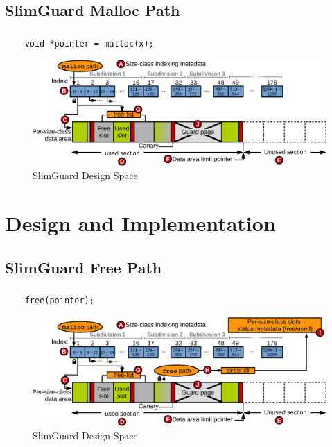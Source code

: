 \documentclass{beamer}
\begin{document}
\subsection{SlimGuard Malloc Path}
\begin{frame}[fragile]
		\frametitle{\secname}
    \framesubtitle{\subsecname}
    \begin{verbatim}
    void *pointer = malloc(x);
    \end{verbatim}
    \begin{figure}
      \centering
      \includegraphics[scale=0.35]{overview2.pdf}
      \\ SlimGuard Design Space
    \end{figure}
\end{frame}

\section{Design and Implementation}
\subsection{SlimGuard Free Path}
\begin{frame}[fragile]
		\frametitle{\secname}
    \framesubtitle{\subsecname}
    \begin{verbatim}
    free(pointer);
    \end{verbatim}
    \begin{figure}
      \centering
      \includegraphics[scale=0.35]{overview3.pdf}
      \\ SlimGuard Design Space
    \end{figure}
\end{frame}
\end{document}
